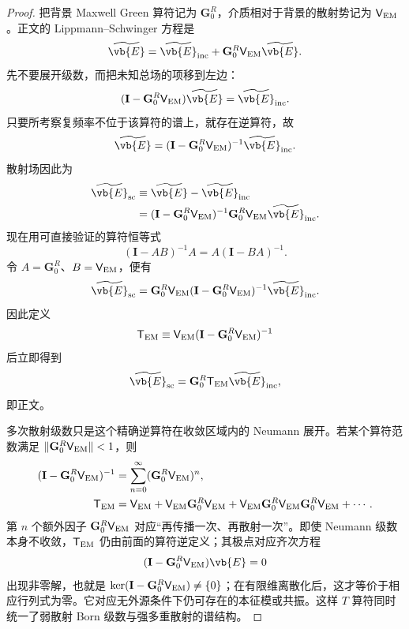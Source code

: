 \begin{proof}
把背景 Maxwell Green 算符记为 $\mathbf G_0^R$，介质相对于背景的散射势记为 $\mathsf V_{\rm EM}$。正文的 Lippmann--Schwinger 方程是
\[
\widetilde{\vb{E}}
=\widetilde{\vb{E}}_{\rm inc}
+\mathbf G_0^R\mathsf V_{\rm EM}\widetilde{\vb{E}}.
\]
先不要展开级数，而把未知总场的项移到左边：
\[
(\mathbf I-\mathbf G_0^R\mathsf V_{\rm EM})\widetilde{\vb{E}}
=\widetilde{\vb{E}}_{\rm inc}.
\]
只要所考察复频率不位于该算符的谱上，就存在逆算符，故
\[
\widetilde{\vb{E}}
=(\mathbf I-\mathbf G_0^R\mathsf V_{\rm EM})^{-1}
\widetilde{\vb{E}}_{\rm inc}.
\]
散射场因此为
\begin{align*}
\widetilde{\vb{E}}_{\rm sc}
&\equiv\widetilde{\vb{E}}-\widetilde{\vb{E}}_{\rm inc}\\
&=(\mathbf I-\mathbf G_0^R\mathsf V_{\rm EM})^{-1}
\mathbf G_0^R\mathsf V_{\rm EM}\widetilde{\vb{E}}_{\rm inc}.
\end{align*}
现在用可直接验证的算符恒等式
\[
(\mathbf I-AB)^{-1}A=A(\mathbf I-BA)^{-1}.
\]
令 $A=\mathbf G_0^R$、$B=\mathsf V_{\rm EM}$，便有
\[
\widetilde{\vb{E}}_{\rm sc}
=\mathbf G_0^R
\mathsf V_{\rm EM}
(\mathbf I-\mathbf G_0^R\mathsf V_{\rm EM})^{-1}
\widetilde{\vb{E}}_{\rm inc}.
\]
因此定义
\[
{
\mathsf T_{\rm EM}
\equiv\mathsf V_{\rm EM}
(\mathbf I-\mathbf G_0^R\mathsf V_{\rm EM})^{-1}}
\]
后立即得到
\[
{
\widetilde{\vb{E}}_{\rm sc}
=\mathbf G_0^R\mathsf T_{\rm EM}\widetilde{\vb{E}}_{\rm inc}},
\]
即正文。

多次散射级数只是这个精确逆算符在收敛区域内的 Neumann 展开。若某个算符范数满足 $\lVert\mathbf G_0^R\mathsf V_{\rm EM}\rVert<1$，则
\begin{align*}
(\mathbf I-\mathbf G_0^R\mathsf V_{\rm EM})^{-1}
&=\sum_{n=0}^{\infty}(\mathbf G_0^R\mathsf V_{\rm EM})^n,\\
\mathsf T_{\rm EM}
&=\mathsf V_{\rm EM}
+\mathsf V_{\rm EM}\mathbf G_0^R\mathsf V_{\rm EM}
+\mathsf V_{\rm EM}\mathbf G_0^R\mathsf V_{\rm EM}\mathbf G_0^R\mathsf V_{\rm EM}+\cdots.
\end{align*}
第 $n$ 个额外因子 $\mathbf G_0^R\mathsf V_{\rm EM}$ 对应“再传播一次、再散射一次”。即使 Neumann 级数本身不收敛，$\mathsf T_{\rm EM}$ 仍由前面的算符逆定义；其极点对应齐次方程
\[
(\mathbf I-\mathbf G_0^R\mathsf V_{\rm EM})\vb{E}=0
\]
出现非零解，也就是
$\ker(\mathbf I-\mathbf G_0^R\mathsf V_{\rm EM})\neq\{0\}$；在有限维离散化后，这才等价于相应行列式为零。它对应无外源条件下仍可存在的本征模或共振。这样 $T$ 算符同时统一了弱散射 Born 级数与强多重散射的谱结构。
\end{proof}

